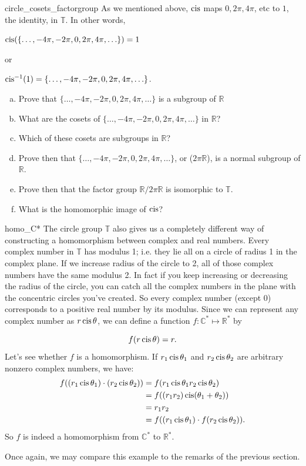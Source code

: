 \begin{exercise}{circle_cosets_factorgroup}
As we mentioned above, $\operatorname{cis}$ maps $0, 2\pi, 4\pi$, etc to $1$, the identity, in ${ \mathbb T}$. In other words,

$\operatorname{cis}(\{ \ldots , -4\pi, -2\pi, 0, 2\pi, 4\pi, \ldots \}) = 1$

\noindent
or 

$\operatorname{cis}^{-1}(1) = \{ \ldots , -4\pi, -2\pi, 0, 2\pi, 4\pi, \ldots \}$.

\begin{enumerate}[(a)]
\item
Prove that $\{ \ldots , -4\pi, -2\pi, 0, 2\pi, 4\pi, \ldots \}$ is a subgroup of ${ \mathbb R}$
\item
What are the cosets of $\{ \ldots , -4\pi, -2\pi, 0, 2\pi, 4\pi, \ldots \}$ in ${ \mathbb R}$?
\item
Which  of these cosets are subgroups in ${ \mathbb R}$?
\item
Prove then that $\{ \ldots , -4\pi, -2\pi, 0, 2\pi, 4\pi, \ldots \}$, or ($2\pi { \mathbb R}$), is a normal subgroup of ${ \mathbb R}$.
\item
Prove then that the factor group ${ \mathbb R} / 2\pi { \mathbb R}$ is isomorphic to ${ \mathbb T}$.
\item
What is the homomorphic image of $\operatorname{cis}$?
\end{enumerate}
\end{exercise} 

\begin{example}{homo_C*}
The circle group ${ \mathbb T}$ also gives us a completely different way of constructing a homomorphism between complex and real numbers.  Every complex number in ${ \mathbb T}$ has modulus 1; i.e. they lie all on a circle of radius 1 in the complex plane.  If we increase radius of the circle to 2, all of those complex numbers have the same modulus 2.  In fact if you keep increasing or decreasing the radius of the circle, you can catch all the complex numbers in the plane with the concentric circles you've created.  So every complex number (except 0) corresponds to a positive real number by its modulus. Since we can represent any complex number as $r \operatorname{cis} \theta$, we can define a function
$f:  {\mathbb C}^\ast \mapsto  {\mathbb R}^\ast$ by

\[
f(r \operatorname{cis} \theta) = r.
\]
Let's see whether $f$ is a homomorphism. If $r_1 \operatorname{cis} \theta_1$ and $r_2 \operatorname{cis} \theta_2$ are arbitrary nonzero complex numbers, we have:
\begin{align*}
f((r_1\operatorname{cis} \theta_1)\cdot (r_2\operatorname{cis} \theta_2)) &= f(r_1 \operatorname{cis} \theta_1 r_2 \operatorname{cis} \theta_2)\\
&= f((r_1 r_2)\operatorname{cis} (\theta_1+ \theta_2))\\
&= r_1 r_2 \\
&= f((r_1\operatorname{cis} \theta_1)\cdot f(r_2\operatorname{cis} \theta_2)).
\end{align*}
So $f$ is indeed a homomorphism from ${\mathbb C}^\ast$ to ${\mathbb R}^\ast$.
\end{example}
Once again, we may compare this example to the remarks of the previous section.

